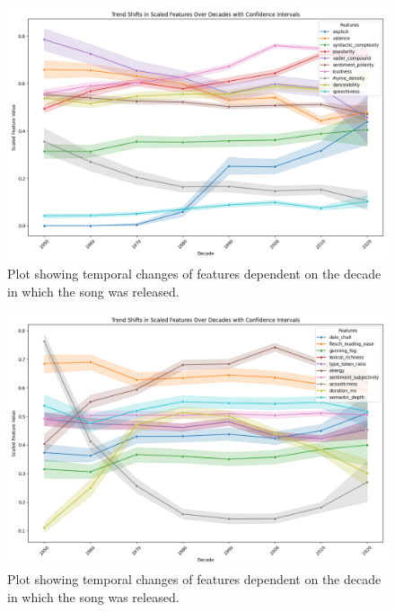 \begin{center}
\begin{figure}[H]
  \centering
  \includegraphics[width=5in]{img/temporal_trends_1.png}
  \caption{Plot showing temporal changes of features dependent on the decade in
  which the song was released.}
  \label{Figure:fig_eh}
\end{figure}
\end{center}

\begin{center}
\begin{figure}[H]
  \centering
  \includegraphics[width=5in]{img/temporal_trends_2.png}
  \caption{Plot showing temporal changes of features dependent on the decade in
  which the song was released.}
  \label{Figure:fig_eh}
\end{figure}
\end{center}

